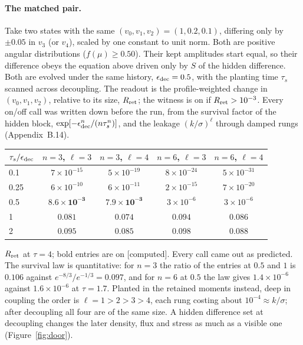 \documentclass[11pt]{article}
\newcommand{\grade}[1]{\textsf{\small[#1]}}
\begin{document}
\paragraph{The matched pair.} Take two states with the same $(v_0,v_1,v_2)=(1,0.2,0.1)$, differing only by $\pm0.05$ in $v_3$ (or $v_4$), scaled by one constant to unit norm. Both are positive angular distributions ($f(\mu)\ge0.50$). Their kept amplitudes start equal, so their difference obeys the equation above driven only by $S$ of the hidden difference. Both are evolved under the same history, $\epsilon_{\rm dec}=0.5$, with the planting time $\tau_s$ scanned across decoupling. The readout is the profile-weighted change in $(v_0,v_1,v_2)$, relative to its size, $R_{\rm ret}$; the witness is on if $R_{\rm ret}>10^{-3}$. Every on/off call was written down before the run, from the survival factor of the hidden block, $\exp[-\epsilon_{\rm dec}^n/(n\tau_s^n)]$, and the leakage $(k/\sigma)^\ell$ through damped rungs (Appendix~B.14).

\begin{center}\begin{tabular}{lcccc}\toprule
$\tau_s/\epsilon_{\rm dec}$ & $n=3$, $\ell=3$ & $n=3$, $\ell=4$ & $n=6$, $\ell=3$ & $n=6$, $\ell=4$\\\midrule
0.1 & $7\times10^{-15}$ & $5\times10^{-19}$ & $8\times10^{-24}$ & $5\times10^{-31}$\\
0.25 & $6\times10^{-10}$ & $6\times10^{-11}$ & $2\times10^{-15}$ & $7\times10^{-20}$\\
0.5 & $\mathbf{8.6\times10^{-3}}$ & $\mathbf{7.9\times10^{-3}}$ & $3\times10^{-6}$ & $3\times10^{-6}$\\
1 & $\mathbf{0.081}$ & $\mathbf{0.074}$ & $\mathbf{0.094}$ & $\mathbf{0.086}$\\
2 & $\mathbf{0.095}$ & $\mathbf{0.085}$ & $\mathbf{0.098}$ & $\mathbf{0.088}$\\\bottomrule\end{tabular}\end{center}
$R_{\rm ret}$ at $\tau=4$; bold entries are on \grade{computed}. Every call came out as predicted. The survival law is quantitative: for $n=3$ the ratio of the entries at $0.5$ and $1$ is $0.106$ against $e^{-8/3}/e^{-1/3}=0.097$, and for $n=6$ at $0.5$ the law gives $1.4\times10^{-6}$ against $1.6\times10^{-6}$ at $\tau=1.7$. Planted in the retained moments instead, deep in coupling the order is $\ell=1>2>3>4$, each rung costing about $10^{-4}\approx k/\sigma$; after decoupling all four are of the same size. A hidden difference set at decoupling changes the later density, flux and stress as much as a visible one (Figure~\ref{fig:door}).
\end{document}
